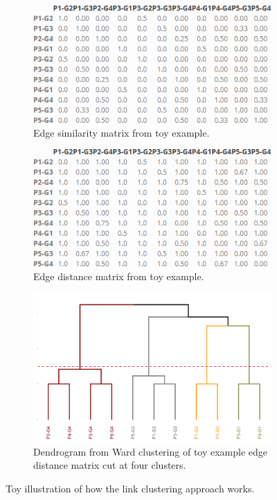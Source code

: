 \documentclass[a4paper,12pt]{extarticle}
\begin{document}
\begin{figure}
    \captionsetup[subfigure]{font=footnotesize,labelfont=footnotesize}
    \centering
     \begin{subfigure}[b]{0.4\textwidth}
        \includegraphics[width=1.0\textwidth]{Toy/toy-sim.png}
        \caption{Edge similarity matrix from toy example.}
        \label{tab:toy-sim}
    \end{subfigure}
     \begin{subfigure}[b]{0.4\textwidth}
        \includegraphics[width=1.0\textwidth]{Toy/toy-dis.png}
        \caption{Edge distance matrix from toy example.}
        \label{tab:toy-dis}
    \end{subfigure}
     \begin{subfigure}[b]{0.6\textwidth}
        \includegraphics[width=1.0\textwidth]{Toy/link-clust-toy.png}
        \caption{Dendrogram from Ward clustering of toy example edge distance matrix cut at four clusters.}
        \label{fig:link-toy}
    \end{subfigure}
    \caption{Toy illustration of how the link clustering approach works.}
    \label{fig:link-toy-ex}
 \end{figure}
\end{document}
